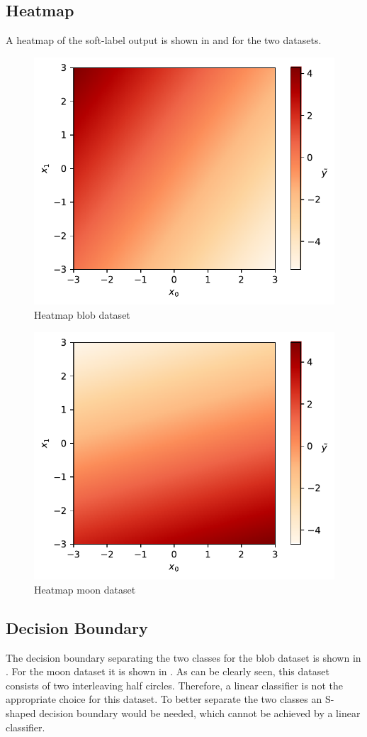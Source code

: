 \documentclass[12pt,a4paper]{scrartcl}
\begin{document}
	\subsection*{Heatmap}
	
	A heatmap of the soft-label output is shown in  and  for the two datasets.
	
	\begin{figure}[H]
		\centering	\includegraphics[width=0.5\linewidth]{figs/ex1_2_heatm_blob.pdf}
		\caption{Heatmap blob dataset}
		\label{fig:ex1_2_heatmap_blob}
	\end{figure}

	\begin{figure}[H]
		\centering	\includegraphics[width=0.5\linewidth]{figs/ex1_2_heatm_moon.pdf}
		\caption{Heatmap moon dataset}
		\label{fig:ex1_2_heatmap_moon}
	\end{figure}
	
	\subsection*{Decision Boundary}
	
	The decision boundary separating the two classes for the blob dataset is shown in .
	For the moon dataset it is shown in .
	As can be clearly seen, this dataset consists of two interleaving half circles. Therefore, a linear classifier is not the appropriate choice for this dataset. To better separate the two classes an S-shaped decision boundary would be needed, which cannot be achieved by a linear classifier.
	
\end{document}
